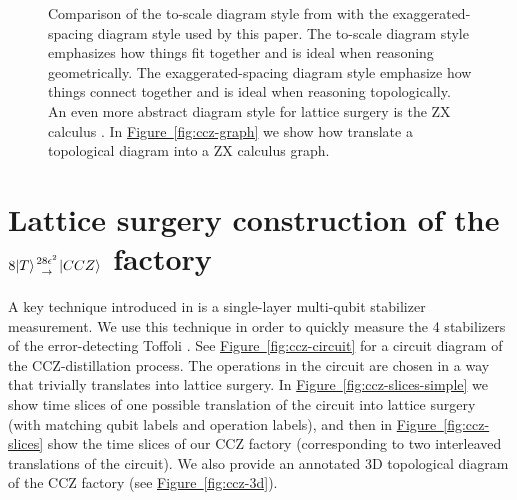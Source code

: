 \documentclass[superscriptaddress,notitlepage,longbibliography]{revtex4-1}
\newcommand{\fig}[1]{\hyperref[fig:#1]{Figure~\ref*{fig:#1}}}
\newcommand{\factory}[3]{$#1 \genfrac{}{}{0pt}{}{#2}{\rightarrow} {#3}$ factory}
\begin{document}
\begin{figure}[ht]
  \label{fig:diagram-style-3d}
  \caption{
    Comparison of the to-scale diagram style from \cite{fowler2018} with the exaggerated-spacing diagram style used by this paper.
    The to-scale diagram style emphasizes how things fit together and is ideal when reasoning geometrically.
    The exaggerated-spacing diagram style emphasize how things connect together and is ideal when reasoning topologically.
    An even more abstract diagram style for lattice surgery is the ZX calculus \cite{de2017}.
    In \fig{ccz-graph} we show how translate a topological diagram into a ZX calculus graph.
  }
\end{figure}




\section{\texorpdfstring{
    Lattice surgery construction of the \factory{8|T\rangle}{28\epsilon^2}{|CCZ\rangle}
}{
    Lattice surgery construction of the 8T to CCZ  factory
}}
\label{sec:ccz}

A key technique introduced in \cite{fowler2018} is a single-layer multi-qubit stabilizer measurement.
We use this technique in order to quickly measure the 4 stabilizers of the error-detecting Toffoli \cite{jones2013, eastin2013distilling}.
See \fig{ccz-circuit} for a circuit diagram of the CCZ-distillation process.
The operations in the circuit are chosen in a way that trivially translates into lattice surgery.
In \fig{ccz-slices-simple} we show time slices of one possible translation of the circuit into lattice surgery (with matching qubit labels and operation labels), and then in \fig{ccz-slices} show the time slices of our CCZ factory (corresponding to two interleaved translations of the circuit).
We also provide an annotated 3D topological diagram of the CCZ factory (see \fig{ccz-3d}).
\end{document}
